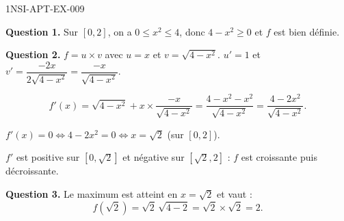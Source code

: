 \begin{corrige}{1NSI-APT-EX-009}

\textbf{Question 1.} Sur $[0,2]$, on a $0 \leq x^2 \leq 4$, donc $4 - x^2 \geq 0$ et $f$ est bien définie.


\textbf{Question 2.} $f = u \times v$ avec $u=x$ et $v=\sqrt{4-x^2}$.
$u'=1$ et $v' = \dfrac{-2x}{2\sqrt{4-x^2}} = \dfrac{-x}{\sqrt{4-x^2}}$.

\[ f'(x) = \sqrt{4-x^2} + x \times \frac{-x}{\sqrt{4-x^2}} = \frac{4-x^2-x^2}{\sqrt{4-x^2}} = \frac{4-2x^2}{\sqrt{4-x^2}}. \]

$f'(x) = 0 \iff 4-2x^2 = 0 \iff x = \sqrt{2}$ (sur $[0,2]$).

$f'$ est positive sur $[0,\sqrt{2}]$ et négative sur $[\sqrt{2}, 2]$ : $f$ est croissante puis décroissante.

\textbf{Question 3.} Le maximum est atteint en $x = \sqrt{2}$ et vaut :
\[ f(\sqrt{2}) = \sqrt{2}\,\sqrt{4-2} = \sqrt{2} \times \sqrt{2} = \boxed{2}. \]

\end{corrige}
